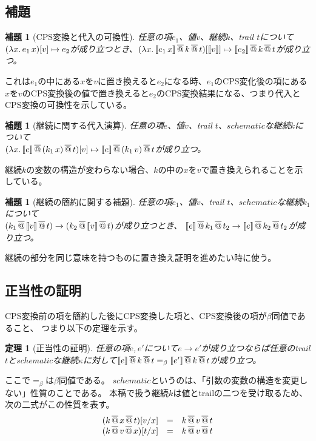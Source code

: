 \documentclass[japanese,draft]{jssst_ppl} %
\newtheorem{lemma}[definition]{補題}
\newtheorem{theorem}[definition]{定理}
\begin{document}
\subsection{補題}
\begin{lemma}[CPS変換と代入の可換性]
  任意の項$e_1$、値$v$、継続$k$、trail $t$について$\LamP{x}{e_1\,x}[v]\mapsto e_2$が成り立つとき、$\LamP{x}{\CPSTh{e_1\,x} \SAppS k \SAppS t}[\CPSTh{v}] \mapsto \CPSTh{e_2} \SAppS k \SAppS t$が成り立つ。
\end{lemma}
これは$e_1$の中にある$x$を$v$に置き換えると$e_2$になる時、$e_1$のCPS変化後の項にある$x$を$v$のCPS変換後の値で置き換えると$e_2$のCPS変換結果になる、つまり代入とCPS変換の可換性を示している。

\begin{lemma}[継続に関する代入演算]
  任意の項$e$、値$v$、trail $t$、$schematic$な継続$k$について\\
  $\LamP{x}{\CPSTh{e} \SAppS (k_1\, x) \SAppS t}[v] \mapsto \CPSTh{e} \SAppS (k_1\,v) \SAppS t$が成り立つ。
\end{lemma}
継続$k$の変数の構造が変わらない場合、$k$の中の$x$を$v$で置き換えられることを示している。

\begin{lemma}[継続の簡約に関する補題]
  任意の項$e_1$、値$v$、trail $t$、$schematic$な継続$k_1$について\\
  $(k_1 \SAppS \CPSTh{v} \SAppS t) \to (k_2 \SAppS \CPSTh{v} \SAppS t)$が成り立つとき、
  $\CPSTh{e}\SAppS k_1 \SAppS t_2 \to \CPSTh{e}\SAppS k_2 \SAppS t_2$が成り立つ。
\end{lemma}
継続の部分を同じ意味を持つものに置き換え証明を進めたい時に使う。

\subsection{正当性の証明}
CPS変換前の項を簡約した後にCPS変換した項と、CPS変換後の項が$\beta$同値であること、
つまり以下の定理を示す。
\begin{theorem}[正当性の証明]
  任意の項$e$,$\, e'$について$e \to e'$が成り立つならば任意のtrail $t$とschematicな継続$\kappa$に対して$\CPSTh{e}\SAppS k \SAppS t =_{\beta} \CPSTh{e'} \SAppS k \SAppS t$が成り立つ。
\end{theorem}

ここで$=_{\beta}$は$\beta$同値である。
$schematic$というのは、「引数の変数の構造を変更しない」性質のことである。
本稿で扱う継続$k$は値とtrailの二つを受け取るため、
次の二式がこの性質を表す。\\
\[
\begin{array}{lcl}
  (k \SAppS x \SAppS t)[\Change{x}{v}] & = & k \SAppS v \SAppS t\\
  (k \SAppS v \SAppS x)[\Change{x}{t}] & = & k \SAppS v \SAppS t\\
\end{array}
\]
\end{document}
